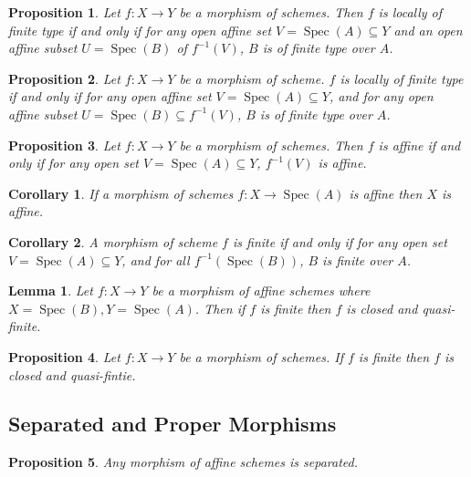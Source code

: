 \documentclass{article}
\newtheorem{proposition}{Proposition}[section]
\newtheorem{lemma}{Lemma}[section]
\newtheorem{corollary}{Corollary}[section]
\numberwithin{equation}{section}
\DeclareMathOperator{\Spec}{Spec}
\begin{document}
\begin{proposition}
Let $f:X\to Y$ be a morphism of schemes. Then $f$ is locally of finite type if and only if for any open affine set $V=\Spec(A)\subseteq Y$ and an open affine subset $U=\Spec(B)$ of $f^{-1}(V)$, $B$ is of finite type over $A$.
\end{proposition}

\begin{proposition}
Let $f:X\to Y$ be a morphism of scheme. $f$ is locally of finite type if and only if for any open affine set $V=\Spec(A)\subseteq Y$, and for any open affine subset $U=\Spec(B)\subseteq f^{-1}(V)$, $B$ is of finite type over $A$.
\end{proposition}

\begin{proposition}
Let $f:X\to Y$ be a morphism of schemes. Then $f$ is affine if and only if for any open set $V=\Spec(A)\subseteq Y$, $f^{-1}(V)$ is affine.
\end{proposition}

\begin{corollary}
If a morphism of schemes $f:X\to\Spec(A)$ is affine then $X$ is affine.
\end{corollary}

\begin{corollary}
A morphism of scheme $f$ is finite if and only if for any open set $V=\Spec(A)\subseteq Y$, and for all $f^{-1}(\Spec(B))$, $B$ is finite over $A$.%
\end{corollary}

\begin{lemma}
Let $f:X\to Y$ be a morphism of affine schemes where $X= \Spec(B),Y = \Spec(A)$. Then if $f$ is finite then $f$ is closed and quasi-finite.
\end{lemma}

\begin{proposition}
Let $f:X\to Y$ be a morphism of schemes. If $f$ is finite then $f$ is closed and quasi-fintie.
\end{proposition}

\subsection{Separated and Proper Morphisms}

\begin{proposition}
Any morphism of affine schemes is separated. 
\end{proposition}
\end{document}
